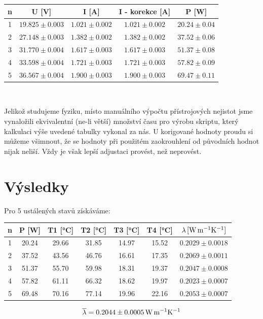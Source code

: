 \documentclass[czech,11pt,a4paper]{article}
\begin{document}
  \begin{center}
  	 \begin{tabular}{|c|c|c|c|c|}
   	\hline
   	n & U [V] & I [A]& I - korekce [A]& P [W]\\
   	\hline
   	1 & $19.825 \pm 0.003$ & $ 1.021 \pm 0.002 $ & $ 1.021 \pm 0.002  $& $20.24 \pm 0.04$\\
   	\hline
   	2 & $27.148 \pm 0.003$ & $ 1.382 \pm 0.002 $  & $ 1.382 \pm 0.002 $& $37.52 \pm 0.06$\\
   	\hline
   	3 & $31.770 \pm 0.004 $& $1.617 \pm 0.003 $& $1.617 \pm 0.003 $&  $51.37 \pm 0.08$\\
   	\hline
   	4 & $33.598 \pm 0.004 $ & $1.721 \pm 0.003 $  & $1.721 \pm 0.003 $& $57.82 \pm 0.09$\\
   	\hline
   	5 & $ 36.567 \pm 0.004$ & $1.900 \pm 0.003 $ & $1.900 \pm 0.003 $ &  $ 69.47 \pm 0.11$\\
   	\hline
   \end{tabular}\\
  \end{center}
   Jelikož studujeme fyziku, místo manuálního výpočtu přístrojových nejistot jsme vynaložili ekvivalentní (ne-li větší) množství času pro výrobu skriptu, který kalkulaci výše uvedené tabulky vykonal za nás. U korigované hodnoty proudu si můžeme všimnout, že se hodnoty při použitém zaokrouhlení od původních hodnot nijak neliší. Vždy je však lepší adjustaci provést, než neprovést. \newpage
   
   \section{Výsledky}
   
   Pro 5 ustálených stavů získáváme: \\
   \begin{center}
   	\begin{tabular}{|c|c|c|c|c|c|c|}
   	\hline
   	n & P   [W]  & T1 [°C]   & T2 [°C]    & T3 [°C]   & T4 [°C]   & $\lambda \,\rm [W \, m^{-1} K^{-1}]$        \\ \hline
   	1 & 20.24 & 29.66 & 31.85 & 14.97 & 15.52 & $0.2029 \pm 0.0018$ \\ \hline
   	2 & 37.52 & 43.56 & 46.76 & 16.61 & 17.35 & $0.2069\pm 0.0011 $\\ \hline
   	3 & 51.37 & 55.70 & 59.98 & 18.31 & 19.37 & $0.2047 \pm0.0008$ \\ \hline
   	4 & 57.82 & 61.11 & 66.32 & 18.62 & 19.97 & $0.2023\pm 0.0007$ \\ \hline
   	5 & 69.48 & 70.16 & 77.14 & 19.96 & 22.16 & $0.2053 \pm 0.0007$ \\ \hline
   \end{tabular}
   \end{center}
   \begin{equation}
   	\overline{\lambda} = 0.2044 \pm 0.0005 \,\rm W \, m^{-1} K^{-1}
   \end{equation}
   
\end{document}

